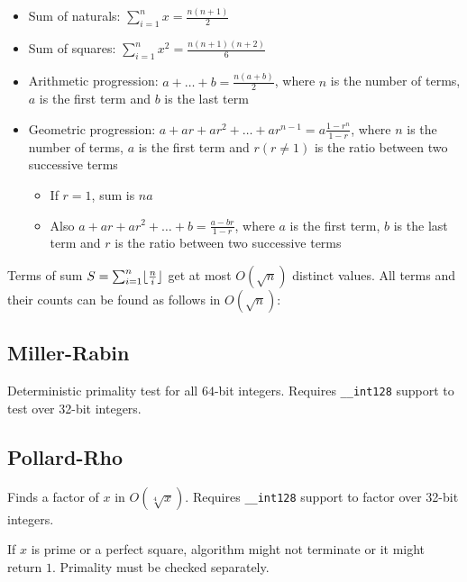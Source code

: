\documentclass{article}
\DeclarePairedDelimiter\floor{\lfloor}{\rfloor} %
\begin{document}
\begin{itemize}

	\item Sum of naturals: $\sum_{i=1}^{n} x = \frac{n(n+1)}{2}$
	\item Sum of squares: $\sum_{i=1}^{n} x^2 = \frac{n(n+1)(n+2)}{6}$
	\item Arithmetic progression: $a + \dots + b = \frac{n(a+b)}{2}$, where $n$ is the number of terms, $a$ is the first term and $b$ is the last term
	\item Geometric progression: $a + ar + ar^2 + \dots + ar^{n-1} = a \frac{1-r^n}{1-r}$, where $n$ is the number of terms, $a$ is the first term and $r (r \neq 1)$ is the ratio between two successive terms
	\begin{itemize}
		\item If $r = 1$, sum is $na$
		\item Also $a + ar + ar^2 + \dots + b = \frac{a-br}{1-r}$, where $a$ is the first term, $b$ is the last term and $r$ is the ratio between two successive terms
	\end{itemize}

\end{itemize}

Terms of sum $S = \sum_{i=1}^{n} \floor{\frac{n}{i}}$ get at most $O(\sqrt{n})$ distinct values. All terms and their counts can be found as follows in $O(\sqrt{n})$:



\subsection {Miller-Rabin}

Deterministic primality test for all $64$-bit integers. Requires \verb|__int128| support to test over 32-bit integers.



\subsection {Pollard-Rho}

Finds a factor of $x$ in $O(\sqrt[4]{x})$. Requires \verb|__int128| support to factor over 32-bit integers.

If $x$ is prime or a perfect square, algorithm might not terminate or it might return $1$. Primality must be checked separately.
\end{document}
